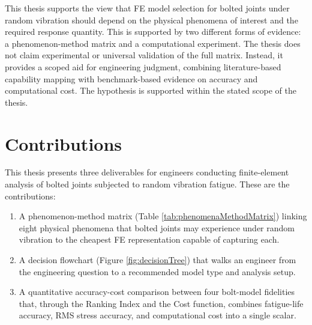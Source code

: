 \documentclass[a4paper,twoside]{bth}
\begin{document}
This thesis supports the view that \ac{FE} model selection for bolted joints under random vibration should depend on the physical phenomena of interest and the required response quantity. This is supported by two different forms of evidence: a phenomenon-method matrix and a computational experiment. The thesis does not claim experimental or universal validation of the full matrix. Instead, it provides a scoped aid for engineering judgment, combining literature-based capability mapping with benchmark-based evidence on accuracy and computational cost. The hypothesis is supported within the stated scope of the thesis.

\section{Contributions}

This thesis presents three deliverables for engineers conducting finite-element analysis of bolted joints subjected to random vibration fatigue. These are the contributions:

\begin{enumerate}
    \item A phenomenon-method matrix (Table \ref{tab:phenomenaMethodMatrix}) linking eight physical phenomena that bolted joints may experience under random vibration to the cheapest \ac{FE} representation capable of capturing each.
    \item A decision flowchart (Figure \ref{fig:decisionTree}) that walks an engineer from the engineering question to a recommended model type and analysis setup.
    \item A quantitative accuracy-cost comparison between four bolt-model fidelities that, through the Ranking Index and the Cost function, combines fatigue-life accuracy, \ac{RMS} stress accuracy, and computational cost into a single scalar.
\end{enumerate}
\end{document}
